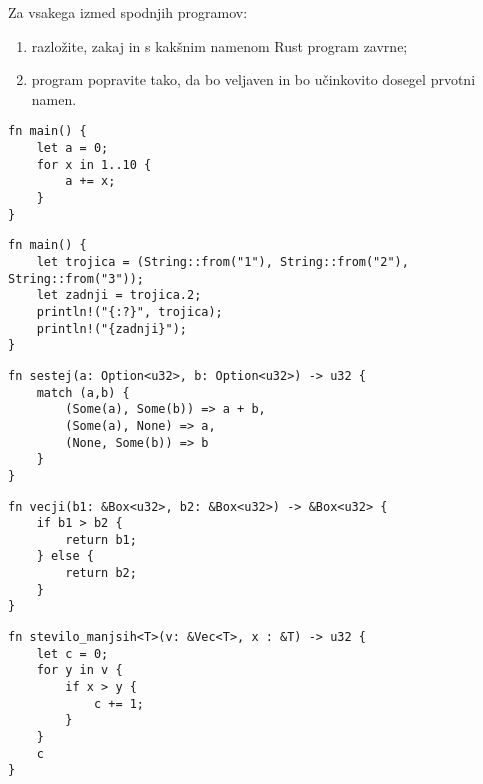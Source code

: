 \documentclass[11pt]{../izpit}
\begin{document}

\naloga[\tocke{30}]
Za vsakega izmed spodnjih programov:
\begin{enumerate}
  \item razložite, zakaj in s kakšnim namenom Rust program zavrne;
  \item program popravite tako, da bo veljaven in bo učinkovito dosegel prvotni namen.
\end{enumerate}

\podnaloga
\begin{verbatim}
fn main() {
    let a = 0;
    for x in 1..10 {
        a += x;
    }
}
\end{verbatim}

\podnaloga
\begin{verbatim}
fn main() {
    let trojica = (String::from("1"), String::from("2"), String::from("3"));
    let zadnji = trojica.2;
    println!("{:?}", trojica);
    println!("{zadnji}");
}
\end{verbatim}

\podnaloga
\begin{verbatim}
fn sestej(a: Option<u32>, b: Option<u32>) -> u32 {
    match (a,b) {
        (Some(a), Some(b)) => a + b,
        (Some(a), None) => a,
        (None, Some(b)) => b
    }
}
\end{verbatim}

\podnaloga

\begin{verbatim}
fn vecji(b1: &Box<u32>, b2: &Box<u32>) -> &Box<u32> {
    if b1 > b2 {
        return b1;
    } else {
        return b2;
    }
}
\end{verbatim}

\podnaloga

\begin{verbatim}
fn stevilo_manjsih<T>(v: &Vec<T>, x : &T) -> u32 {
    let c = 0;
    for y in v {
        if x > y {
            c += 1;
        }
    }
    c
}
\end{verbatim}
\end{document}
